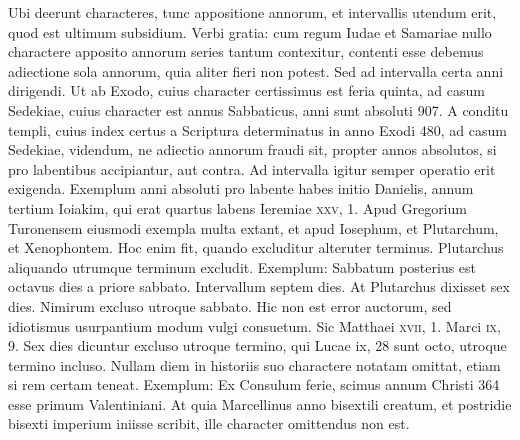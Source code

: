 Ubi deerunt characteres,
tunc appositione annorum, et intervallis utendum erit, quod est ultimum
subsidium.
Verbi gratia: cum regum Iudae et Samariae nullo
charactere apposito annorum series tantum contexitur, contenti esse
debemus adiectione sola annorum, quia aliter fieri non potest.
Sed
ad intervalla certa anni dirigendi.
Ut ab Exodo, cuius character certissimus
est feria quinta, ad casum Sedekiae, cuius character est annus
Sabbaticus, anni sunt absoluti 907.
A conditu templi, cuius index certus
a Scriptura determinatus in anno Exodi 480, ad casum Sedekiae,
videndum, ne adiectio annorum fraudi sit, propter annos absolutos,
si pro labentibus accipiantur, aut contra.
Ad intervalla igitur
semper operatio erit exigenda.
Exemplum anni absoluti pro labente
habes initio Danielis, annum tertium Ioiakim, qui erat quartus labens
Ieremiae \textsc{xxv}, 1.
Apud Gregorium Turonensem eiusmodi
exempla multa extant, et apud Iosephum, et Plutarchum, et
Xenophontem.
Hoc enim fit, quando excluditur alteruter terminus.
Plutarchus aliquando utrumque terminum excludit.
Exemplum: Sabbatum
posterius est octavus dies a priore sabbato.
Intervallum septem
dies.
At Plutarchus dixisset sex dies.
Nimirum excluso utroque
sabbato.
Hic non est error auctorum, sed idiotismus usurpantium
modum vulgi consuetum.
Sic Matthaei \textsc{xvii}, 1.
 Marci \textsc{ix}, 9.
Sex
dies dicuntur excluso utroque termino, qui Lucae {ix}, 28
 sunt octo,
utroque termino incluso.
Nullam diem in historiis suo charactere
notatam omittat, etiam si rem certam teneat.
Exemplum: Ex Consulum
ferie, scimus annum Christi 364 esse primum Valentiniani.
At quia Marcellinus anno bisextili creatum,
 et postridie bisexti imperium
iniisse scribit, ille character omittendus non est.
